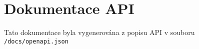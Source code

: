 \chapter{Dokumentace API}
\label{app:api}

Tato dokumentace byla vygenerována z popisu API v souboru \lstinline|/docs/openapi.json|


